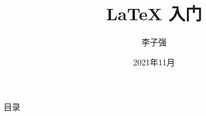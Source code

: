 \documentclass{libs/SUSTech_format}
\title[\LaTeX{} 入门]{\huge \textbf{\LaTeX{} 入门}}
\author[CRA 计算机研究协会]{李子强}
\institute[SUSTech]{
    \normalsize{\email{lizq2019@mail.sustech.edu.cn}}
    \newline
    \department{计算机科学与工程系} %
    \newline
    \normalsize
    南方科技大学研究生院
}
\date{2021年11月}
\begin{document}



{
    \begin{frame}
    \maketitle
    \end{frame}
}

\begin{frame}{目录}
    \begin{multicols}{2}
        \tableofcontents
    \end{multicols}
\end{frame}







\end{document}
